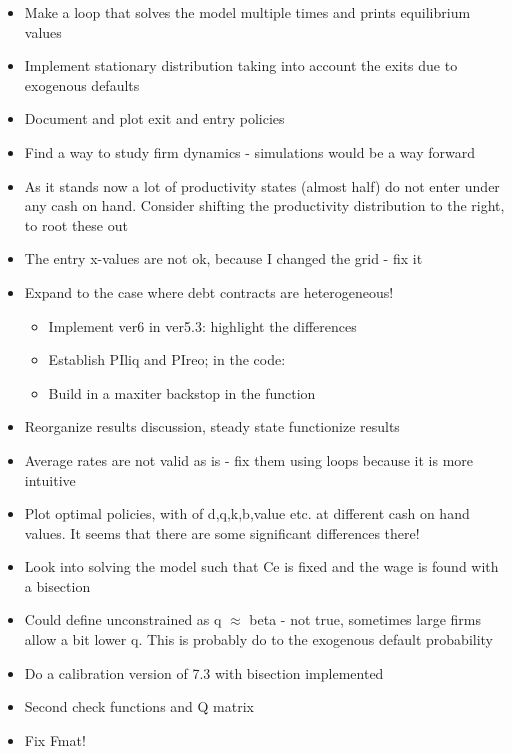 \documentclass[12pt]{article}
\begin{document}
\begin{itemize}
    \item Make a loop that solves the model multiple times and prints equilibrium values \checkmark
    \item Implement stationary distribution taking into account the exits due to exogenous defaults \checkmark
    \item Document and plot exit and entry policies \checkmark
    \item Find a way to study firm dynamics - simulations would be a way forward \checkmark
    \item As it stands now a lot of productivity states (almost half) do not enter under any cash on hand. Consider shifting the productivity distribution to the right, to root these out
    \item The entry x-values are not ok, because I changed the grid - fix it \checkmark
    \item Expand to the case where debt contracts are heterogeneous! \checkmark
    \begin{itemize}
        \item Implement ver6 in ver5.3: highlight the differences  \checkmark
        \item Establish PIliq and PIreo; in the code: \checkmark 
        \item Build in a maxiter backstop in the function \checkmark
    \end{itemize}
    \item Reorganize results discussion, steady state functionize results  \checkmark
    \item Average rates are not valid as is - fix them using loops because it is more intuitive  \checkmark
    \item Plot optimal policies, with of d,q,k,b,value etc. at different cash on hand values. It seems that there are some significant differences there! \checkmark
    \item Look into solving the model such that Ce is fixed and the wage is found with a bisection \checkmark
    \item Could define unconstrained as q $\approx$ beta - not true, sometimes large firms allow a bit lower q. This is probably do to the exogenous default probability \checkmark
    \item Do a calibration version of 7.3 with bisection implemented \checkmark
    \item Second check functions and Q matrix  \checkmark
    \item Fix Fmat! \checkmark    
        \begin{itemize}

\end{itemize}
\end{itemize}
\end{document}
